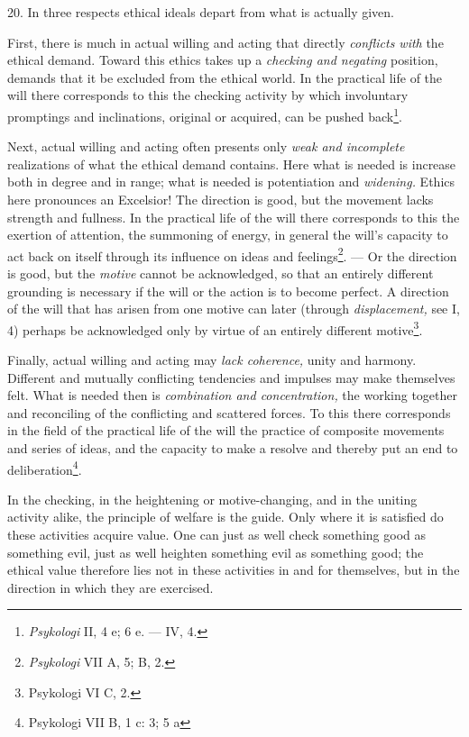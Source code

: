\documentclass[12pt,a4paper,openany]{book}
\newcommand{\opage}[1]{\marginnote{\footnotesize\textit{[#1]}}}
\begin{document}
20. In three respects ethical ideals depart from what is actually given.

First, there is much in actual willing and acting that directly \textit{conflicts with} the ethical
demand. Toward this ethics takes up a \textit{checking and negating} position, demands that it be
excluded from the ethical world. In the practical life of the will there corresponds to this the
checking activity by which involuntary promptings and inclinations, original or acquired, can be
pushed back\footnote[1]{\textit{Psykologi} II, 4 e; 6 e. --- IV, 4.}.

\opage{65}Next, actual willing and acting often presents only \textit{weak and incomplete} realizations of
what the ethical demand contains. Here what is needed is increase both in degree and in range; what
is needed is potentiation and \textit{widening.} Ethics here pronounces an Excelsior! The direction is
good, but the movement lacks strength and fullness. In the practical life of the will there
corresponds to this the exertion of attention, the summoning of energy, in general the will's capacity
to act back on itself through its influence on ideas and feelings\footnote[1]{\textit{Psykologi} VII
A, 5; B, 2.}. --- Or the direction is good, but the \textit{motive} cannot be acknowledged, so that an
entirely different grounding is necessary if the will or the action is to become perfect. A direction
of the will that has arisen from one motive can later (through \textit{displacement,} see I, 4) perhaps
be acknowledged only by virtue of an entirely different motive\footnote[2]{Psykologi VI C, 2.}.

Finally, actual willing and acting may \textit{lack coherence,} unity and harmony. Different and
mutually conflicting tendencies and impulses may make themselves felt. What is needed then is
\textit{combination and concentration,} the working together and reconciling of the conflicting and
scattered forces. To this there corresponds in the field of the practical life of the will the
practice of composite movements and series of ideas, and the capacity to make a resolve and thereby
put an end to deliberation\footnote[3]{Psykologi VII B, 1 c: 3; 5 a}.

In the checking, in the heightening or motive-changing, and in the uniting activity alike, the
principle of welfare is the guide. Only where it is satisfied do these activities acquire value. One
can just as well check something good as something evil, just as well heighten something evil as
something good; the ethical value therefore lies not in these activities in and for themselves, but in
the direction in which they are exercised.
\end{document}
